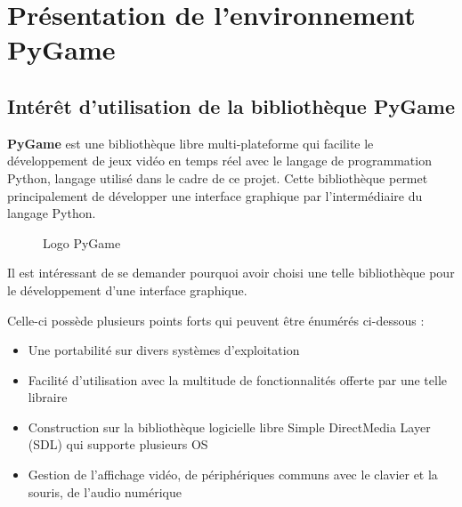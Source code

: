 \documentclass[a4paper]{article}
\begin{document}
\section{Présentation de l'environnement PyGame}

\subsection{Intérêt d'utilisation de la bibliothèque PyGame}

\textbf{PyGame} est une bibliothèque libre multi-plateforme qui facilite le développement de jeux vidéo en temps réel avec le langage de programmation Python, langage utilisé dans le cadre de ce projet.
Cette bibliothèque permet principalement de développer une interface graphique par l'intermédiaire du langage Python.

\begin{figure}[!h] 
\centering
{}
\caption{Logo PyGame} 
\end{figure} 

Il est intéressant de se demander pourquoi avoir choisi une telle bibliothèque pour le développement d'une interface graphique.

\vspace{0.3cm}

Celle-ci possède plusieurs points forts qui peuvent être énumérés ci-dessous :

\begin{itemize}

   \item Une portabilité sur divers systèmes d'exploitation


   \item Facilité d'utilisation avec la multitude de fonctionnalités offerte par une telle libraire

   \item Construction sur la bibliothèque logicielle libre Simple DirectMedia Layer (SDL) qui supporte plusieurs OS

   \item Gestion de l'affichage vidéo, de périphériques communs avec le clavier et la souris,  de l'audio numérique


\end{itemize}
\end{document}
